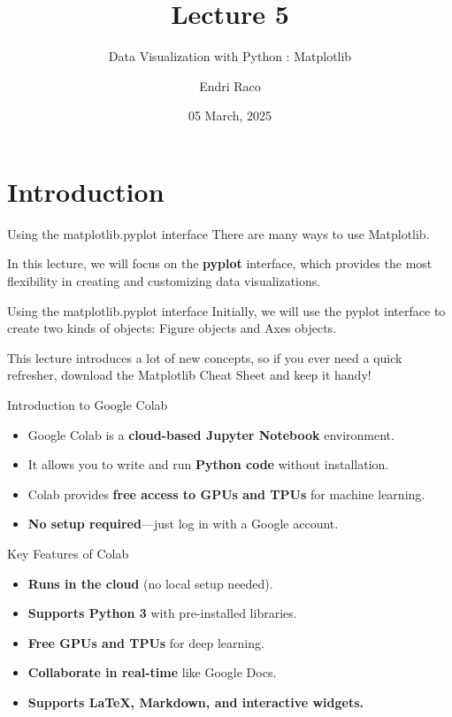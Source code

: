 \documentclass[
  ignorenonframetext,
]{beamer}
\title{Lecture 5}
\subtitle{Data Visualization with Python : Matplotlib}
\author{Endri Raco}
\date{05 March, 2025}
\providecommand{\tightlist}{%
  \setlength{\itemsep}{0pt}\setlength{\parskip}{0pt}}
\begin{document}
\frame{\titlepage}

\begin{frame}[allowframebreaks]
  \tableofcontents[hideallsubsections]
\end{frame}
\section{Introduction}\label{introduction}

\begin{frame}{Using the matplotlib.pyplot interface}
\label{using-the-matplotlib.pyplot-interface}
There are many ways to use Matplotlib.

In this lecture, we will focus on the \textbf{pyplot} interface, which
provides the most flexibility in creating and customizing data
visualizations.
\end{frame}

\begin{frame}{Using the matplotlib.pyplot interface}
\label{using-the-matplotlib.pyplot-interface-1}
Initially, we will use the pyplot interface to create two kinds of
objects: Figure objects and Axes objects.

This lecture introduces a lot of new concepts, so if you ever need a
quick refresher, download the Matplotlib Cheat Sheet and keep it handy!
\end{frame}

\begin{frame}{Introduction to Google Colab}
\label{introduction-to-google-colab}
\begin{itemize}
\tightlist
\item
  Google Colab is a \textbf{cloud-based Jupyter Notebook} environment.
\item
  It allows you to write and run \textbf{Python code} without
  installation.
\item
  Colab provides \textbf{free access to GPUs and TPUs} for machine
  learning.
\item
  \textbf{No setup required}---just log in with a Google account.
\end{itemize}
\end{frame}

\begin{frame}{Key Features of Colab}
\label{key-features-of-colab}
\begin{itemize}
\tightlist
\item
  \textbf{Runs in the cloud} (no local setup needed).
\item
  \textbf{Supports Python 3} with pre-installed libraries.
\item
  \textbf{Free GPUs and TPUs} for deep learning.
\item
  \textbf{Collaborate in real-time} like Google Docs.
\item
  \textbf{Supports LaTeX, Markdown, and interactive widgets.}
\end{itemize}
\end{frame}
\end{document}
